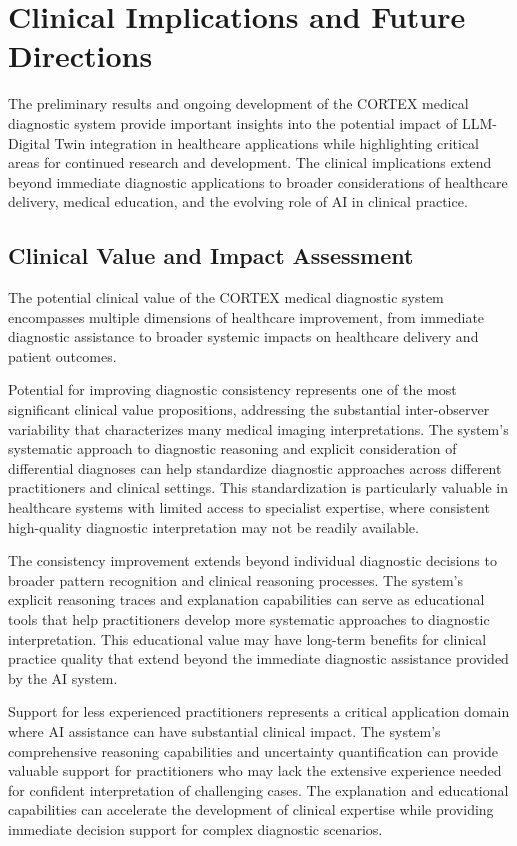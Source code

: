 \section{Clinical Implications and Future Directions}

The preliminary results and ongoing development of the CORTEX medical diagnostic system provide important insights into the potential impact of LLM-Digital Twin integration in healthcare applications while highlighting critical areas for continued research and development. The clinical implications extend beyond immediate diagnostic applications to broader considerations of healthcare delivery, medical education, and the evolving role of AI in clinical practice.

\subsection{Clinical Value and Impact Assessment}

The potential clinical value of the CORTEX medical diagnostic system encompasses multiple dimensions of healthcare improvement, from immediate diagnostic assistance to broader systemic impacts on healthcare delivery and patient outcomes.

Potential for improving diagnostic consistency represents one of the most significant clinical value propositions, addressing the substantial inter-observer variability that characterizes many medical imaging interpretations. The system's systematic approach to diagnostic reasoning and explicit consideration of differential diagnoses can help standardize diagnostic approaches across different practitioners and clinical settings. This standardization is particularly valuable in healthcare systems with limited access to specialist expertise, where consistent high-quality diagnostic interpretation may not be readily available.

The consistency improvement extends beyond individual diagnostic decisions to broader pattern recognition and clinical reasoning processes. The system's explicit reasoning traces and explanation capabilities can serve as educational tools that help practitioners develop more systematic approaches to diagnostic interpretation. This educational value may have long-term benefits for clinical practice quality that extend beyond the immediate diagnostic assistance provided by the AI system.

Support for less experienced practitioners represents a critical application domain where AI assistance can have substantial clinical impact. The system's comprehensive reasoning capabilities and uncertainty quantification can provide valuable support for practitioners who may lack the extensive experience needed for confident interpretation of challenging cases. The explanation and educational capabilities can accelerate the development of clinical expertise while providing immediate decision support for complex diagnostic scenarios.

